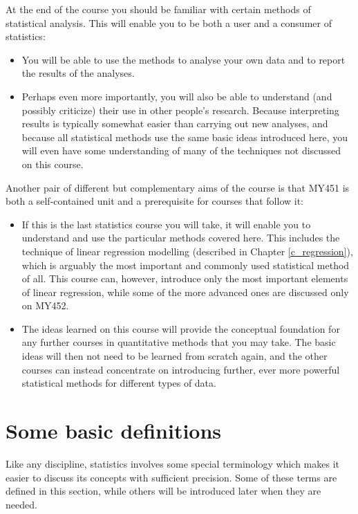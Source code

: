 At the end of the course you should be familiar with certain methods of
statistical analysis. This will enable you to be both a user and a
consumer of statistics:
\begin{itemize}
\item You will be able to use
the methods to analyse your own data and to report the results of the
analyses.
\item
Perhaps even more importantly, you will also be able to understand
(and possibly criticize) their use in other people's research. Because
interpreting results is typically somewhat easier than carrying out new
analyses, and because all statistical methods use the same basic ideas
introduced here, you will even have some understanding of many of the
techniques not discussed on this course.
\end{itemize}
Another pair of different but complementary aims of the
course is that MY451 is both a self-contained unit and a prerequisite for
courses that follow it:
\begin{itemize}
\item
If this is the last statistics course you will take, it will enable you
to understand and use the particular methods covered here. This includes
the technique of linear regression modelling (described in Chapter
\ref{c_regression}), which is arguably the most important and commonly
used statistical method of all. This course can, however, introduce only
the most important elements of linear regression, while some of the more
advanced ones are discussed only on MY452.
\item
The ideas learned on this course will provide the conceptual foundation
for any further courses in quantitative methods that you may take.
The basic ideas will then not need to be learned from scratch
again, and the other courses can instead concentrate on introducing
further, ever more powerful statistical methods for different types of
data.
\end{itemize}

\section{Some basic definitions}
\label{s_intro_definitions}

Like any discipline, statistics involves some special terminology which
makes it easier to discuss its concepts with sufficient precision. Some
of these terms are defined in this section, while others will be
introduced later when they are needed.

